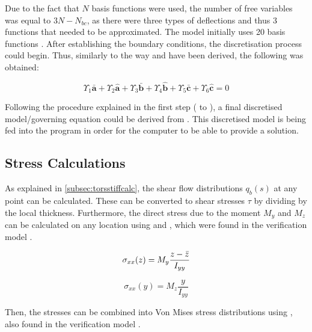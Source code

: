 Due to the fact that $N$ basis functions were used, the number of free variables was equal to $3N- N_{bc}$, as there were three types of deflections and thus 3 functions that needed to be approximated. The model initially uses 20 basis functions \cite{Verification_model_description}. After establishing the boundary conditions, the discretisation process could begin. Thus, similarly to the way  and  have been derived, the following was obtained:

\begin{equation}
    \label{eq:new_form_of_BC_final}
    \Upsilon_{1} \mathbf{\bar{a}}+\Upsilon_{2} \mathbf{\hat{a}}+\Upsilon_{3} \mathbf{\bar{b}}+\Upsilon_{4} \mathbf{\hat{b}}+\Upsilon_{5} \mathbf{\bar{c}}+\Upsilon_{6} \mathbf{\hat{c}}=0
\end{equation}

Following the procedure explained in the first step ( to ), a final discretised model/governing equation could be derived from . This discretised model is being fed into the program in order for the computer to be able to provide a solution.  

\subsection{Stress Calculations}
As explained in \autoref{subsec:torsstiffcalc}, the shear flow distributions $q_b(s)$ at any point can be calculated. These can be converted to shear stresses $\tau$ by dividing by the local thickness. 
Furthermore, the direct stress due to the moment $M_y$ and $M_z$ can be calculated on any location using  and , which were found in the verification model \cite{Verification_model_description}.

\begin{equation} \label{eq:sigma_xxz}
    \sigma_{xx}(z) = M_y \frac{z - \Bar{z}}{I_{yy}}
\end{equation}

\begin{equation} \label{eq:sigma_xxy}
    \sigma_{xx}(y) = M_z \frac{y}{I_{yy}}
\end{equation}

\noindent Then, the stresses can be combined into Von Mises stress distributions using , also found in the verification model \cite{Verification_model_description}.

